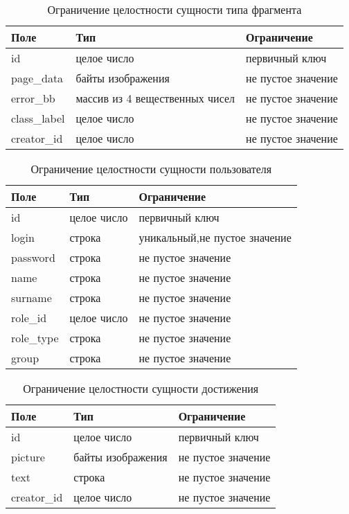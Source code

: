 \begin{table}[htbp]
	 \centering
	 \caption{Ограничение целостности сущности типа фрагмента}
	\begin{tabularx}{\textwidth}{|X|X|X|}
		\hline
		Поле & Тип & Ограничение \\
		\hline
		id & целое число & первичный ключ \\
		\hline
		page\_data & байты изображения & не пустое значение\\
		\hline
		error\_bb & массив из 4 вещественных чисел & не пустое значение\\
		\hline
		class\_label & целое число & не пустое значение\\
		\hline
		creator\_id & целое число & не пустое значение\\
		\hline
	\end{tabularx}
	\label{t:markups}
\end{table}



\begin{table}[htbp]
	\centering
	\caption{Ограничение целостности сущности пользователя}
	\begin{tabularx}{\textwidth}{|X|X|X|}
	\hline
	Поле & Тип & Ограничение \\
	\hline
	id & целое число & первичный ключ\\
	\hline
	login & строка & уникальный,не пустое значение\\
	\hline
	password & строка & не пустое значение\\
	\hline
	name & строка & не пустое значение\\
	\hline
	surname & строка & не пустое значение\\
	\hline
	role\_id & целое число & не пустое значение\\
	\hline
	role\_type & строка & не пустое значение\\
	\hline
	group & строка & не пустое значение\\
	\hline
	\end{tabularx}
	\label{t:users_cons}
\end{table}


\begin{table}[htbp]
	\centering
	\caption{Ограничение целостности сущности достижения}
	\begin{tabularx}{\textwidth}{|X|X|X|}
		\hline
		Поле & Тип & Ограничение \\
		\hline
		id & целое число & первичный ключ\\
		\hline
		picture & байты изображения &  не пустое значение\\
		\hline
		text & строка & не пустое значение\\
		\hline
		creator\_id & целое число & не пустое значение\\
		\hline
	\end{tabularx}
	\label{t:achievment_cons}
\end{table}



